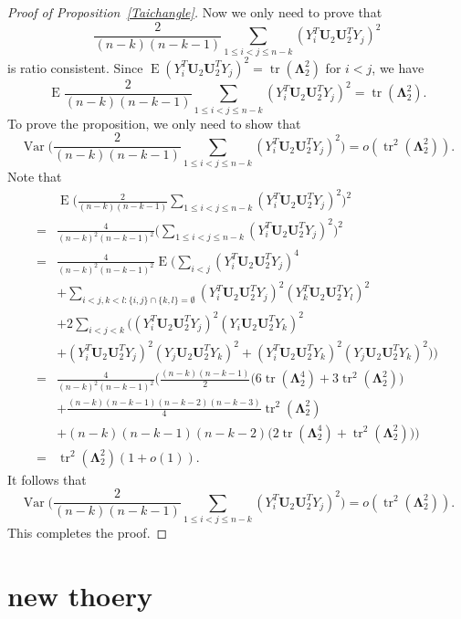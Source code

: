 \documentclass[12pt]{article} %
\DeclareMathOperator{\mytr}{tr}
\DeclareMathOperator{\myE}{E}
\DeclareMathOperator{\myVar}{Var}
\newcommand{\bU}{\mathbf{U}}
\newcommand{\bfsym}[1]{\ensuremath{\boldsymbol{#1}}}
\def\bLambda {\bfsym {\Lambda}}
\theoremstyle{definition}
\begin{document}
\begin{appendices}
\begin{proof}[Proof of Proposition~\ref{Taichangle}]
        Now we only need to prove that
        $$
    \frac{2}{(n-k)(n-k-1)}\sum_{1\leq i<j\leq n-k}(Y_i^T \bU_2 \bU_2^T Y_j)^2 
        $$
        is ratio consistent.
        Since $\myE (Y_i^T \bU_2 \bU_2^T Y_j)^2=\mytr(\bLambda_2^2)$ for $i< j$, we have
    $$
        \myE
    \frac{2}{(n-k)(n-k-1)}\sum_{1\leq i<j\leq n-k}(Y_i^T \bU_2 \bU_2^T Y_j)^2 
        =\mytr(\bLambda_2^2).
        $$
        To prove the proposition, we only need to show that 
        $$
        \myVar
    \Big(
    \frac{2}{(n-k)(n-k-1)}\sum_{1\leq i<j\leq n-k}(Y_i^T \bU_2 \bU_2^T Y_j)^2 
    \Big)
        =o(\mytr^2(\bLambda_2^2)).
        $$
         Note that
         $$
        \begin{aligned}
            &\myE\Big(
    \frac{2}{(n-k)(n-k-1)}\sum_{1\leq i<j\leq n-k}(Y_i^T \bU_2 \bU_2^T Y_j)^2 
            \Big)^2\\
            =&
            \frac{4}{(n-k)^2(n-k-1)^2}\Big(\sum_{1\leq i < j\leq n-k}(Y_i^T \bU_2 \bU_2^T Y_j)^2\Big)^2\\
            =&
            \frac{4}{(n-k)^2(n-k-1)^2}\myE\Big( \sum_{i<j}(Y_i^T\bU_2 \bU_2^T Y_j)^4\\
            &+
            \sum_{i<j,k<l:\{i,j\}\cap\{k,l\}=\emptyset}(Y_i^T\bU_2 \bU_2^T Y_j)^2 (Y_k^T\bU_2 \bU_2^T Y_l)^2\\
            &+2\sum_{i<j<k}\big((Y_i^T\bU_2 \bU_2^T Y_j)^2(Y_i\bU_2 \bU_2^T Y_k)^2\\
            &+(Y_i^T\bU_2 \bU_2^T Y_j)^2(Y_j\bU_2 \bU_2^T Y_k)^2+(Y_i^T\bU_2 \bU_2^T Y_k)^2(Y_j\bU_2 \bU_2^T Y_k)^2\big) \Big)\\
            =&
    \frac{4}{(n-k)^2(n-k-1)^2}\Big(
            \frac{(n-k)(n-k-1)}{2}\big(6\mytr(\bLambda_2^4)+3\mytr^2(\bLambda_2^2)\big)\\
            &+\frac{(n-k)(n-k-1)(n-k-2)(n-k-3)}{4}\mytr^2(\bLambda_2^2)\\
            &+(n-k)(n-k-1)(n-k-2)\big(2\mytr(\bLambda_2^4)
            +\mytr^2(\bLambda_2^2)\big)
            \Big)\\
            =&
            \mytr^2(\bLambda_2^2)(1+o(1)).
        \end{aligned}
         $$
        It follows that
        $$
        \myVar
    \Big(\frac{2}{(n-k)(n-k-1)}\sum_{1\leq i<j\leq n-k}(Y_i^T \bU_2 \bU_2^T Y_j)^2 
    \Big)
            =
            o(\mytr^2(\bLambda_2^2)).
        $$
        This completes the proof.
\end{proof}
\section{new thoery}

\end{appendices}
\end{document}
